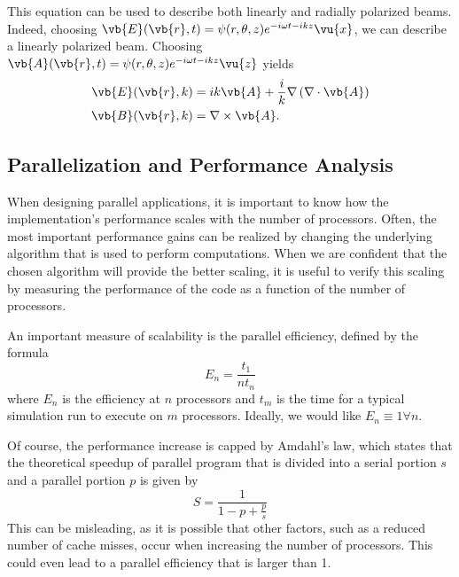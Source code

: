 \documentclass[11pt,SymmetricalJury]{inrsthesis/inrsthesis}
\begin{document}
This equation can be used to describe both linearly and radially polarized
beams. Indeed, choosing $\vb{E}(\vb{r},t)=\psi(r,\theta,z)e^{-i\omega t -ikz}\vu{x}$,
we can describe a linearly polarized beam. Choosing $\vb{A}(\vb{r},t)=\psi(r,\theta,z)e^{-i\omega t - ikz}\vu{z}$
yields
  \begin{align}
    \vb{E}(\vb{r},k) &= ik\vb{A}+\frac{i}{k}\nabla\left(\nabla\cdot\vb{A}\right) \\
    \vb{B}(\vb{r},k) &= \nabla\times\vb{A}.
  \end{align}



\subsection{Parallelization and Performance Analysis}

When designing parallel applications, it is important to know how the implementation's
performance scales with the number of processors. Often, the most important
performance gains can be realized by changing the underlying algorithm that
is used to perform computations. When we are confident that the chosen algorithm
will provide the better scaling, it is useful to verify this scaling by measuring
the performance of the code as a function of the number of processors.

An important measure of scalability is the parallel efficiency, defined by the
formula
  \begin{equation}
    E_n = \frac{t_1}{nt_n}
  \end{equation}
where $E_n$ is the efficiency at $n$ processors and $t_m$ is the time for a typical
simulation run to execute on $m$ processors. Ideally, we would like
$E_n\equiv1\forall n$.

Of course, the performance increase is capped by Amdahl's law, which states that
the theoretical speedup of parallel program that is divided into a serial portion
$s$ and a parallel portion $p$ is given by
  \begin{equation}
    S = \frac{1}{1-p+\frac{p}{s}}
  \end{equation}
This can be misleading, as it is possible that other factors, such as a reduced
number of cache misses, occur when increasing the number of processors.
This could even lead to a parallel efficiency that is larger than 1.
\end{document}
